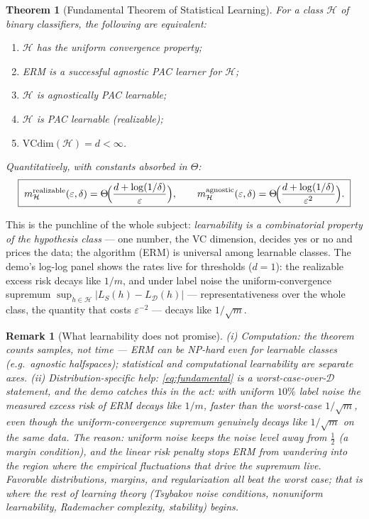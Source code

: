 \documentclass[11pt]{article}
\newtheorem{theorem}{Theorem}
\newtheorem{remark}{Remark}
\newcommand{\D}{\mathcal{D}}
\newcommand{\Hyp}{\mathcal{H}}
\newcommand{\err}{L_{\D}}
\newcommand{\emperr}{L_{S}}
\newcommand{\VC}{\mathrm{VCdim}}
\begin{document}
\begin{theorem}[Fundamental Theorem of Statistical Learning]
\label{thm:fundamental}
For a class $\Hyp$ of binary classifiers, the following are equivalent:
\begin{enumerate}
  \item $\Hyp$ has the uniform convergence property;
  \item ERM is a successful agnostic PAC learner for $\Hyp$;
  \item $\Hyp$ is agnostically PAC learnable;
  \item $\Hyp$ is PAC learnable (realizable);
  \item $\VC(\Hyp) = d < \infty$.
\end{enumerate}
Quantitatively, with constants absorbed in $\Theta$:
\begin{equation}
  \boxed{\;
  m^{\mathrm{realizable}}_{\Hyp}(\varepsilon,\delta)
  = \Theta\!\Bigl(\frac{d + \log(1/\delta)}{\varepsilon}\Bigr),
  \qquad
  m^{\mathrm{agnostic}}_{\Hyp}(\varepsilon,\delta)
  = \Theta\!\Bigl(\frac{d + \log(1/\delta)}{\varepsilon^{2}}\Bigr).
  \;}
  \label{eq:fundamental}
\end{equation}
\end{theorem}

This is the punchline of the whole subject: \emph{learnability is a
combinatorial property of the hypothesis class} --- one number, the VC
dimension, decides yes or no and prices the data; the algorithm (ERM)
is universal among learnable classes. The demo's log-log panel shows the
rates live for thresholds ($d=1$): the realizable excess risk decays like
$1/m$, and under label noise the uniform-convergence supremum
$\sup_{h\in\Hyp}|\emperr(h)-\err(h)|$ --- representativeness over the
whole class, the quantity that costs $\varepsilon^{-2}$ --- decays like
$1/\sqrt m$.

\begin{remark}[What learnability does not promise]
(i) \emph{Computation}: the theorem counts samples, not time --- ERM can
be NP-hard even for learnable classes (e.g.\ agnostic halfspaces);
statistical and computational learnability are separate axes.
(ii) \emph{Distribution-specific help}: \eqref{eq:fundamental} is a
worst-case-over-$\D$ statement, and the demo catches this in the act:
with uniform $10\%$ label noise the measured \emph{excess risk of ERM}
decays like $1/m$, faster than the worst-case $1/\sqrt m$, even though
the uniform-convergence supremum genuinely decays like $1/\sqrt m$ on the
same data. The reason: uniform noise keeps the noise level away from
$\tfrac12$ (a \emph{margin} condition), and the linear risk penalty stops
ERM from wandering into the region where the empirical fluctuations that
drive the supremum live. Favorable distributions, margins, and
regularization all beat the worst case; that is where the rest of
learning theory (Tsybakov noise conditions, nonuniform learnability,
Rademacher complexity, stability) begins.
\end{remark}
\end{document}

